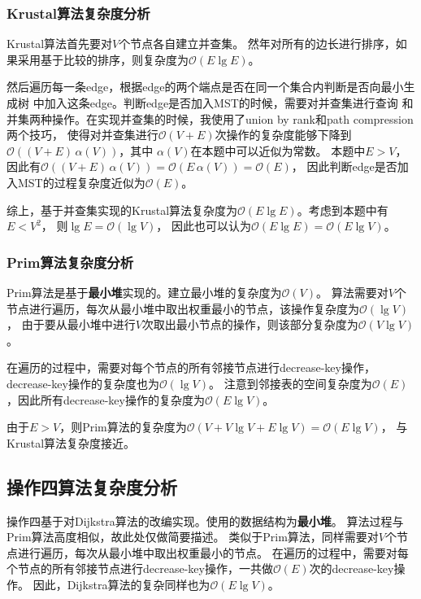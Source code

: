 \documentclass{article}
\begin{document}
\subsubsection{Krustal算法复杂度分析}
Krustal算法首先要对$V$个节点各自建立并查集。
然年对所有的边长进行排序，如果采用基于比较的排序，则复杂度为$\mathcal{O}(E\lg E)$。

然后遍历每一条edge，根据edge的两个端点是否在同一个集合内判断是否向最小生成树
中加入这条edge。判断edge是否加入MST的时候，需要对并查集进行查询
和并集两种操作。在实现并查集的时候，我使用了union by rank和path compression两个技巧，
使得对并查集进行$\mathcal{O}(V+E)$次操作的复杂度能够下降到$\mathcal{O}((V+E)\,\alpha(V))$，其中
$\alpha(V)$在本题中可以近似为常数。
本题中$E>V$，因此有$\mathcal{O}((V+E)\,\alpha(V)) = \mathcal{O}(E\,\alpha(V)) = \mathcal{O}(E)$，
因此判断edge是否加入MST的过程复杂度近似为$\mathcal{O}(E)$。

综上，基于并查集实现的Krustal算法复杂度为$\mathcal{O}(E\lg E)$。考虑到本题中有$E<V^2$，
则$\lg E = \mathcal{O}(\lg V)$，
因此也可以认为$\mathcal{O}(E\lg E) = \mathcal{O}(E\lg V)$。

\subsubsection{Prim算法复杂度分析}
Prim算法是基于\textbf{最小堆}实现的。建立最小堆的复杂度为$\mathcal{O}(V)$。
算法需要对$V$个节点进行遍历，每次从最小堆中取出权重最小的节点，该操作复杂度为$\mathcal{O}(\lg V)$，
由于要从最小堆中进行$V$次取出最小节点的操作，则该部分复杂度为$\mathcal{O}(V\lg V)$。

在遍历的过程中，需要对每个节点的所有邻接节点进行decrease-key操作，
decrease-key操作的复杂度也为$\mathcal{O}(\lg V)$。
注意到邻接表的空间复杂度为$\mathcal{O}(E)$，因此所有decrease-key操作的复杂度为$\mathcal{O}(E\lg V)$。

由于$E>V$，则Prim算法的复杂度为$\mathcal{O}(V + V\lg V + E\lg V) = \mathcal{O}(E\lg V) $，
与Krustal算法复杂度接近。

\subsection{操作四算法复杂度分析}
操作四基于对Dijkstra算法的改编实现。使用的数据结构为\textbf{最小堆}。
算法过程与Prim算法高度相似，故此处仅做简要描述。
类似于Prim算法，同样需要对$V$个节点进行遍历，每次从最小堆中取出权重最小的节点。
在遍历的过程中，需要对每个节点的所有邻接节点进行decrease-key操作，一共做$\mathcal{O}(E)$次的decrease-key操作。
因此，Dijkstra算法的复杂同样也为$\mathcal{O}(E\lg V)$。
\end{document}
